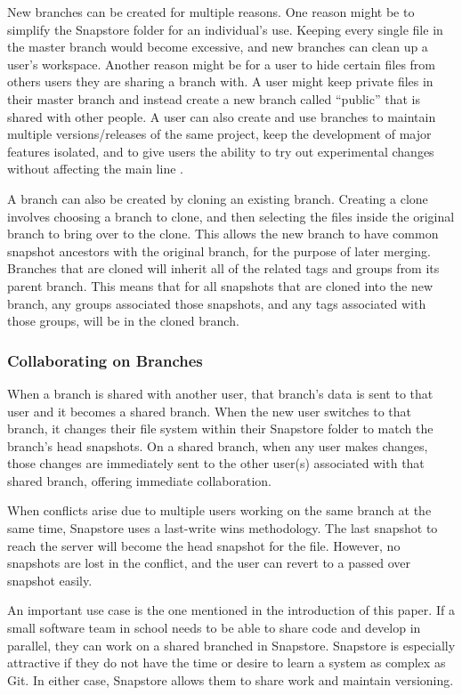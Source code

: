 New branches can be created for multiple reasons. One reason might be to simplify the Snapstore folder for an individual's use. Keeping every single file in the master branch would become excessive, and new branches can clean up a user's workspace. Another reason might be for a user to hide certain files from others users they are sharing a branch with. A user might keep private files in their master branch and instead create a new branch called ``public'' that is shared with other people. A user can also create and use branches to maintain multiple versions/releases of the same project, keep the development of major features isolated, and to give users the ability to try out experimental changes without affecting the main line \cite{RossoJackson}.

A branch can also be created by cloning an existing branch. Creating a clone involves choosing a branch to clone, and then selecting the files inside the original branch to bring over to the clone. This allows the new branch to have common snapshot ancestors with the original branch, for the purpose of later merging. Branches that are cloned will inherit all of the related tags and groups from its parent branch. This means that for all snapshots that are cloned into the new branch, any groups associated those snapshots, and any tags associated with those groups, will be in the cloned branch.

\subsubsection{Collaborating on Branches}

When a branch is shared with another user, that branch's data is sent to that user and it becomes a shared branch. When the new user switches to that branch, it changes their file system within their Snapstore folder to match the branch's head snapshots. On a shared branch, when any user makes changes, those changes are immediately sent to the other user(s) associated with that shared branch, offering immediate collaboration.

When conflicts arise due to multiple users working on the same branch at the same time, Snapstore uses a last-write wins methodology. The last snapshot to reach the server will become the head snapshot for the file. However, no snapshots are lost in the conflict, and the user can revert to a passed over snapshot easily.

An important use case is the one mentioned in the introduction of this paper. If a small software team in school needs to be able to share code and develop in parallel, they can work on a shared branched in Snapstore. Snapstore is especially attractive if they do not have the time or desire to learn a system as complex as Git. In either case, Snapstore allows them to share work and maintain versioning.

